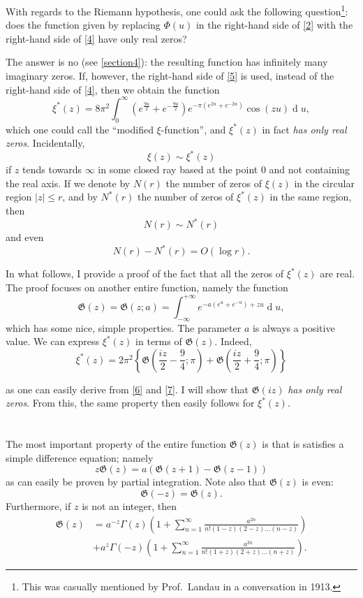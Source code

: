 \documentclass{article}
\newcommand{\dd}{\operatorname{d}\!}
\newcommand{\GG}{\mathfrak{G}}
\renewcommand{\leq}{\leqslant}
\newcommand{\oldpage}[1]{\marginpar{\phantom{.}\\\footnotesize$\Big\vert$ \textit{p.~#1}}}
\begin{document}
\oldpage{306}
With regards to the Riemann hypothesis, one could ask the following question\footnote{This was casually mentioned by Prof.~Landau in a conversation in 1913.}: does the function given by replacing $\Phi(u)$ in the right-hand side of \cref{2} with the right-hand side of \cref{4} have only real zeros?

The answer is no (see \cref{section4}): the resulting function has infinitely many imaginary zeros.
If, however, the right-hand side of \cref{5} is used, instead of the right-hand side of \cref{4}, then we obtain the function
\[
\label{6}
  \xi^*(z) = 8\pi^2 \int_0^\infty \left(
    e^{\frac{9u}{2}} + e^{-\frac{9u}{2}}
  \right) e^{-\pi(e^{2u}+e^{-2u})} \cos(zu) \dd u,
\tag{6}
\]
which one could call the ``modified $\xi$-function'', and $\xi^*(z)$ in fact \emph{has only real zeros}.
Incidentally,
\[
  \xi(z) \sim \xi^*(z)
\]
if $z$ tends towards $\infty$ in some closed ray based at the point $0$ and not containing the real axis.
If we denote by $N(r)$ the number of zeros of $\xi(z)$ in the circular region $|z|\leq r$, and by $N^*(r)$ the number of zeros of $\xi^*(z)$ in the same region, then
\[
  N(r) \sim N^*(r)
\]
and even
\[
  N(r) - N^*(r) = O(\log r).
\]

In what follows, I provide a proof of the fact that all the zeros of $\xi^*(z)$ are real.
The proof focuses on another entire function, namely the function
\[
\label{7}
  \GG(z) = \GG(z;a) = \int_{-\infty}^{+\infty} e^{-a(e^u+e^{-u})+zu} \dd u,
\tag{7}
\]
which has some nice, simple properties.
The parameter $a$ is always a positive value.
We can express $\xi^*(z)$ in terms of $\GG(z)$.
Indeed,
\[
\label{8}
  \xi^*(z) = 2\pi^2 \left\{
    \GG\left(
      \frac{iz}{2} - \frac94; \pi
    \right) +
    \GG\left(
      \frac{iz}{2} + \frac94; \pi
    \right)
  \right\}
\tag{8}
\]

\oldpage{307}
as one can easily derive from \cref{6} and \cref{7}.
I will show that $\GG(iz)$ \emph{has only real zeros}.
From this, the same property then easily follows for $\xi^*(z)$.


\section{}
\label{section1}

The most important property of the entire function $\GG(z)$ is that is satisfies a simple difference equation;
namely
\[
\label{9}
  z\GG(z) = a(\GG(z+1) - \GG(z-1))
\tag{9}
\]
as can easily be proven by partial integration.
Note also that $\GG(z)$ is even:
\[
\label{10}
  \GG(-z) = \GG(z).
\tag{10}
\]
Furthermore, if $z$ is not an integer, then
\[
\label{11}
  \begin{aligned}
    \GG(z)
    &= a^{-z}\Gamma(z) \left(
      1 + \sum_{n=1}^\infty \frac{a^{2n}}{n!(1-z)(2-z)\ldots(n-z)}
    \right)
  \\&+ a^z\Gamma(-z) \left(
      1 + \sum_{n=1}^\infty \frac{a^{2n}}{n!(1+z)(2+z)\ldots(n+z)}
    \right).
  \end{aligned}
\tag{11}
\]
\end{document}
